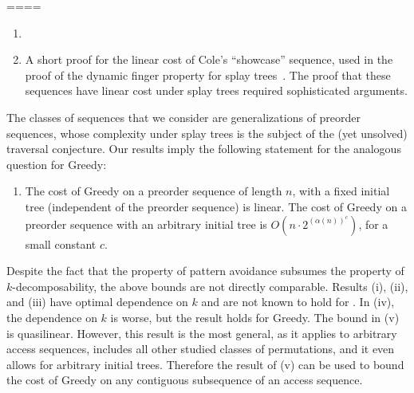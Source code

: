 \iffalse
==== 


\renewcommand{\theenumi}{(\roman{enumi})}%
\begin{enumerate}
\item 
  
 
\item A short proof for the linear cost of Cole's ``showcase'' sequence, used in the proof of the dynamic finger property for splay trees~\cite{finger1}. 
The proof that these sequences have linear cost under splay trees required sophisticated arguments. 
\end{enumerate}

  

 
The classes of sequences that we consider are generalizations of preorder sequences, whose complexity under splay trees is the subject of the (yet unsolved) traversal conjecture. Our results imply the following statement for the analogous question for {\sc Greedy}:

\renewcommand{\theenumi}{(\roman{enumi})}%
\begin{enumerate}\addtocounter{enumi}{5}
\item The cost of {\sc Greedy} on a preorder sequence of length $n$, with a fixed initial tree (independent of the preorder sequence) is linear. The cost of {\sc Greedy} on a preorder sequence with an arbitrary initial tree is $O\left(n \cdot 2^{({\alpha(n)})^c}\right)$, for a small constant $c$. 
\end{enumerate}


Despite the fact that the property of pattern avoidance subsumes the property of $k$-decomposability, the above bounds are not directly comparable. 
Results (i), (ii), and (iii) have optimal dependence on $k$ and are not known to hold for \greedy.  
In (iv), the dependence on $k$ is worse, but the result holds for {\sc Greedy}.  
The bound in (v) is quasilinear. 
However, this result is the most general, as it applies to arbitrary access sequences, includes all other studied classes of permutations, and it even allows for arbitrary initial trees. 
Therefore the result of (v) can be used to bound the cost of {\sc Greedy} on any contiguous subsequence of an access sequence.

